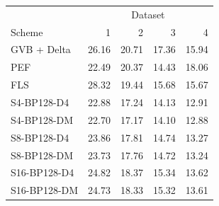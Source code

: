 \begin{tabular}{lrrrr}
\toprule
 & \multicolumn{4}{c}{Dataset} \\
Scheme & 1 & 2 & 3 & 4 \\
\midrule
GVB + Delta & 26.16 & 20.71 & 17.36 & 15.94 \\
PEF & 22.49 & 20.37 & 14.43 & 18.06 \\
FLS & 28.32 & 19.44 & 15.68 & 15.67 \\
S4-BP128-D4 & 22.88 & 17.24 & 14.13 & 12.91 \\
S4-BP128-DM & 22.70 & 17.17 & 14.10 & 12.88 \\
S8-BP128-D4 & 23.86 & 17.81 & 14.74 & 13.27 \\
S8-BP128-DM & 23.73 & 17.76 & 14.72 & 13.24 \\
S16-BP128-D4 & 24.82 & 18.37 & 15.34 & 13.62 \\
S16-BP128-DM & 24.73 & 18.33 & 15.32 & 13.61 \\
\bottomrule
\end{tabular}
